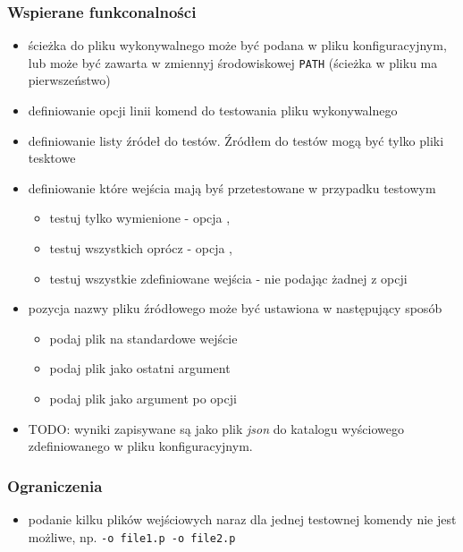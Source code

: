 \documentclass[a4paper,12pt]{article}
\begin{document}
\subsubsection{Wspierane funkconalności}

\begin{itemize}
  \item ścieżka do pliku wykonywalnego może być podana w pliku konfiguracyjnym, lub może być zawarta w zmiennyj środowiskowej \texttt{PATH} (ścieżka w pliku ma pierwszeństwo)
  \item definiowanie opcji linii komend do testowania pliku wykonywalnego
  \item definiowanie listy źródeł do testów. Źródłem do testów mogą być tylko pliki tesktowe
  \item definiowanie które wejścia mają byś przetestowane w przypadku testowym
    \begin{itemize}
      \item testuj tylko wymienione - opcja ,
      \item testuj wszystkich oprócz - opcja ,
      \item testuj wszystkie zdefiniowane wejścia - nie podając żadnej z opcji
    \end{itemize}
  \item pozycja nazwy pliku źródłowego może być ustawiona w następujący sposób
    \begin{itemize}
      \item podaj plik na standardowe wejście 
      \item podaj plik jako ostatni argument 
      \item podaj plik jako argument po opcji 
    \end{itemize}
  \item TODO: wyniki zapisywane są jako plik \textit{json} do katalogu wyściowego zdefiniowanego w pliku konfiguracyjnym.
\end{itemize}

\subsubsection{Ograniczenia}

\begin{itemize}
  \item podanie kilku plików wejściowych naraz dla jednej testownej komendy nie jest możliwe, np. \texttt{-o file1.p -o file2.p}
\end{itemize}
\end{document}

